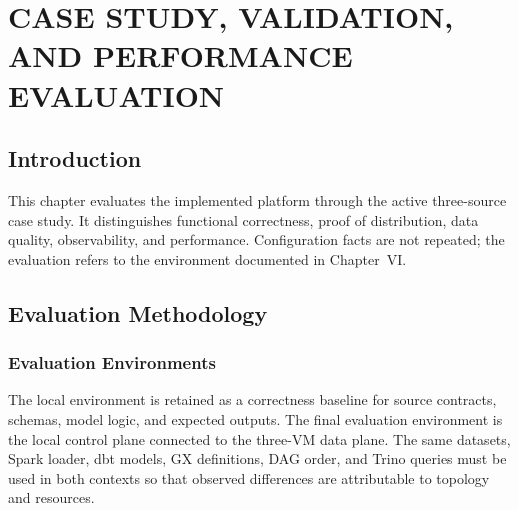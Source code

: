 \clearpage
\chapter{CASE STUDY, VALIDATION, AND PERFORMANCE EVALUATION}

\section{Introduction}
This chapter evaluates the implemented platform through the active three-source case study. It distinguishes functional correctness, proof of distribution, data quality, observability, and performance. Configuration facts are not repeated; the evaluation refers to the environment documented in Chapter~VI.

\section{Evaluation Methodology}

\subsection{Evaluation Environments}
The local environment is retained as a correctness baseline for source contracts, schemas, model logic, and expected outputs. The final evaluation environment is the local control plane connected to the three-VM data plane. The same datasets, Spark loader, dbt models, GX definitions, DAG order, and Trino queries must be used in both contexts so that observed differences are attributable to topology and resources.

